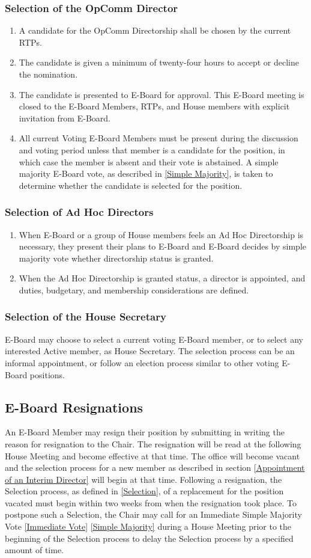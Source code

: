 \documentclass{article}
\newcommand{\asection}[1]{\subsection{#1} \label{#1}}
\newcommand{\asubsection}[1]{\subsubsection{#1} \label{#1}}
\begin{document}
\asubsection{Selection of the OpComm Director}
\begin{enumerate}
	\item A candidate for the OpComm Directorship shall be chosen by the current RTPs.
	\item The candidate is given a minimum of twenty-four hours to accept or decline the nomination.
	\item The candidate is presented to E-Board for approval.
		This E-Board meeting is closed to the E-Board Members, RTPs, and House members with explicit invitation from E-Board.
	\item All current Voting E-Board Members must be present during the discussion and voting period unless that member is a candidate for the position, in which case the member is absent and their vote is abstained.
		A simple majority E-Board vote, as described in \ref{Simple Majority}, is taken to determine whether the candidate is selected for the position.
\end{enumerate}

\asubsection{Selection of Ad Hoc Directors}
\begin{enumerate}
	\item When E-Board or a group of House members feels an Ad Hoc Directorship is necessary, they present their plans to E-Board and E-Board decides by simple majority vote whether directorship status is granted.
	\item When the Ad Hoc Directorship is granted status, a director is appointed, and duties, budgetary, and membership considerations are defined.
\end{enumerate}

\asubsection{Selection of the House Secretary}
E-Board may choose to select a current voting E-Board member, or to select any interested Active member, as House Secretary.
The selection process can be an informal appointment, or follow an election process similar to other voting E-Board positions.

\asection{E-Board Resignations}
An E-Board Member may resign their position by submitting in writing the reason for resignation to the Chair.
The resignation will be read at the following House Meeting and become effective at that time.
The office will become vacant and the selection process for a new member as described in section \ref{Appointment of an Interim Director} will begin at that time.
Following a resignation, the Selection process, as defined in \ref{Selection}, of a replacement for the position vacated must begin within two weeks from when the resignation took place.
To postpone such a Selection, the Chair may call for an Immediate Simple Majority Vote \ref{Immediate Vote} \ref{Simple Majority} during a House Meeting prior to the beginning of the Selection process to delay the Selection process by a specified amount of time.
\end{document}

